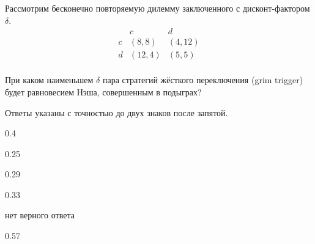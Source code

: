 
\begin{question}
Рассмотрим бесконечно повторяемую дилемму заключенного с
дисконт-фактором \(\delta\). \[
\begin{matrix}
   & c & d \\
c  & (8, 8) & (4, 12) \\
d  & (12, 4) & (5, 5) \\
\end{matrix}
\]

При каком наименьшем \(\delta\) пара стратегий жёсткого переключения
(grim trigger) будет равновесием Нэша, совершенным в подыграх?

Ответы указаны с точностью до двух знаков после запятой.
\begin{answerlist}
  \item 0.4
  \item 0.25
  \item 0.29
  \item 0.33
  \item нет верного ответа
  \item 0.57
\end{answerlist}
\end{question}


